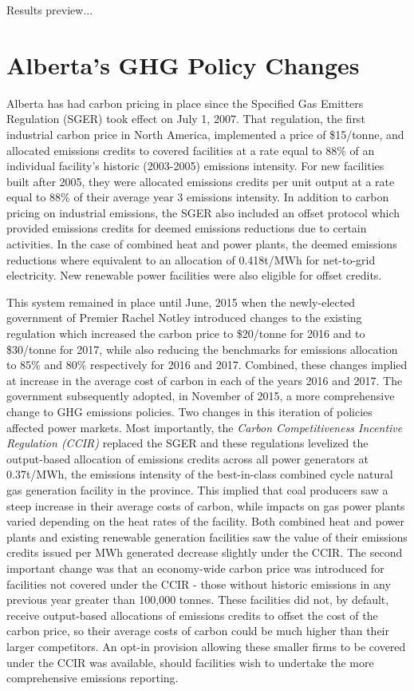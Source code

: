\documentclass[12pt]{article}
\begin{document}
Results preview...


\section{Alberta's GHG Policy Changes}

Alberta has had carbon pricing in place since the Specified Gas Emitters Regulation (SGER) took effect on July 1, 2007. That regulation, the first industrial carbon price in North America, implemented a price of \$15/tonne, and allocated emissions credits to covered facilities at a rate equal to 88\% of an individual facility's historic (2003-2005) emissions intensity. For new facilities built after 2005, they were allocated emissions credits per unit output at a rate equal to 88\% of their average year 3 emissions intensity. In addition to carbon pricing on industrial emissions, the SGER also included an offset protocol which provided emissions credits for deemed emissions reductions due to certain activities.  In the case of combined heat and power plants, the deemed emissions reductions where equivalent to an allocation of 0.418t/MWh for net-to-grid electricity.  New renewable power facilities were also eligible for offset credits.

This system remained in place until June, 2015 when the newly-elected government of Premier Rachel Notley introduced changes to the existing regulation which increased the carbon price to \$20/tonne for 2016 and to \$30/tonne for 2017, while also reducing the benchmarks for emissions allocation to 85\% and 80\% respectively for 2016 and 2017.  Combined, these changes implied at increase in the average cost of carbon in each of the years 2016 and 2017. The government subsequently adopted, in November of 2015, a more comprehensive change to GHG emissions policies. Two changes in this iteration of policies affected power markets.  Most importantly, the \textit{Carbon Competitiveness Incentive Regulation (CCIR)} replaced the SGER and these regulations levelized the output-based allocation of emissions credits across all power generators at 0.37t/MWh, the emissions intensity of the best-in-class combined cycle natural gas generation facility in the province. This implied that coal producers saw a steep increase in their average costs of carbon, while impacts on gas power plants varied depending on the heat rates of the facility. Both combined heat and power plants and existing renewable generation facilities saw the value of their emissions credits issued per MWh generated decrease slightly under the CCIR.  The second important change was that an economy-wide carbon price was introduced for facilities not covered under the CCIR - those without historic emissions in any previous year greater than 100,000 tonnes. These facilities did not, by default, receive output-based allocations of emissions credits to offset the cost of the carbon price, so their average costs of carbon could be much higher than their larger competitors.  An opt-in provision allowing these smaller firms to be covered under the CCIR was available, should facilities wish to undertake the more comprehensive emissions reporting.
\end{document}
